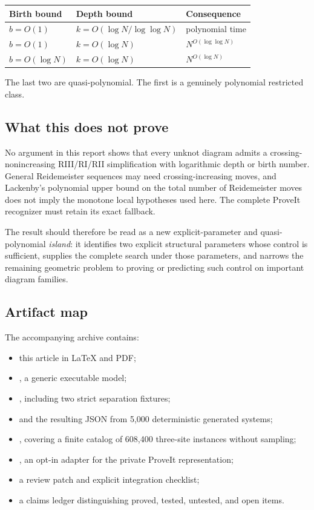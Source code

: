 \begin{center}
\begin{tabular}{@{}lll@{}}
\toprule
Birth bound & Depth bound & Consequence \\
\midrule
$b=O(1)$ & $k=O(\log N/\log\log N)$ & polynomial time \\
$b=O(1)$ & $k=O(\log N)$ & $N^{O(\log\log N)}$ \\
$b=O(\log N)$ & $k=O(\log N)$ & $N^{O(\log N)}$ \\
\bottomrule
\end{tabular}
\end{center}

The last two are quasi-polynomial.  The first is a genuinely polynomial
restricted class.

\subsection{What this does not prove}

No argument in this report shows that every unknot diagram admits a
crossing-nonincreasing RIII/RI/RII simplification with logarithmic depth or birth
number.  General Reidemeister sequences may need crossing-increasing moves, and
Lackenby's polynomial upper bound on the total number of Reidemeister moves does
not imply the monotone local hypotheses used here.  The complete ProveIt
recognizer must retain its exact fallback.

The result should therefore be read as a new explicit-parameter and
quasi-polynomial \emph{island}: it identifies two explicit structural parameters
whose control is sufficient, supplies the complete search under those
parameters, and narrows the remaining geometric problem to proving or predicting
such control on important diagram families.

\subsection{Artifact map}

The accompanying archive contains:
\begin{itemize}
\item this article in LaTeX and PDF;
\item {}, a generic executable model;
\item {}, including two strict separation
      fixtures;
\item {} and the resulting JSON from
      5,000 deterministic generated systems;
\item {}, covering a finite catalog of
      608,400 three-site instances without sampling;
\item {}, an opt-in adapter for the
      private ProveIt  representation;
\item a review patch and explicit integration checklist;
\item a claims ledger distinguishing proved, tested, untested, and open items.
\end{itemize}
